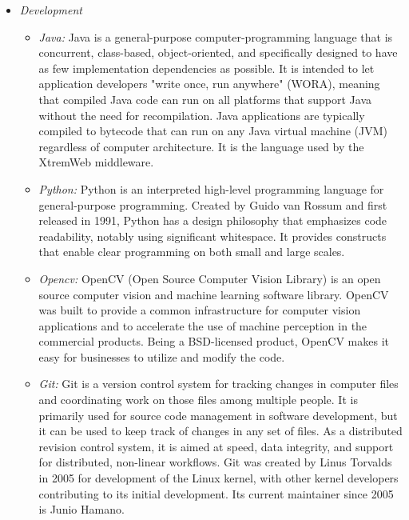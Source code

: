    \begin{itemize}
        \item \textit{Development}
            \begin{itemize}
                \item \textit{Java: }
                Java is a general-purpose computer-programming language that is concurrent, class-based,
                object-oriented, and specifically designed to have as few implementation dependencies as possible.
                It is intended to let application developers "write once, run anywhere" (WORA), meaning that compiled
                Java code can run on all platforms that support Java without the need for recompilation. Java
                applications are typically compiled to bytecode that can run on any Java virtual machine (JVM)
                regardless of computer architecture. It is the language used by the XtremWeb middleware.
                \item \textit{Python: }
                Python is an interpreted high-level programming language for general-purpose programming. Created by
                Guido van Rossum\cite{guido-van-rossum} and first released in 1991, Python has a design philosophy that emphasizes code
                readability, notably using significant whitespace. It provides constructs that enable clear programming
                on both small and large scales.
                \item \textit{Opencv: }
                OpenCV (Open Source Computer Vision Library) is an open source computer vision and machine learning
                software library. OpenCV was built to provide a common infrastructure for computer vision applications
                and to accelerate the use of machine perception in the commercial products. Being a BSD-licensed product,
                OpenCV makes it easy for businesses to utilize and modify the code.
                \item \textit{Git: }
                Git is a version control system for tracking changes in computer files and coordinating work on those
                files among multiple people. It is primarily used for source code management in software development,
                but it can be used to keep track of changes in any set of files. As a distributed revision control system,
                it is aimed at speed, data integrity, and support for distributed, non-linear workflows. Git was created
                by Linus Torvalds in 2005 for development of the Linux kernel, with other kernel developers contributing
                to its initial development. Its current maintainer since 2005 is Junio Hamano.
            \end{itemize}


\end{itemize}
